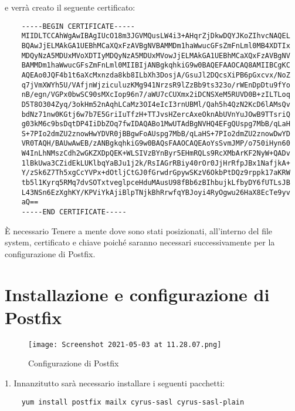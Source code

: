 e verrà creato il seguente certificato:

\begin{verbatim}
    -----BEGIN CERTIFICATE-----
    MIIDLTCCAhWgAwIBAgIUcO18m3JGVMQusLW4i3+AHqrZjDkwDQYJKoZIhvcNAQEL
    BQAwJjELMAkGA1UEBhMCaXQxFzAVBgNVBAMMDm1haWwucGFsZmFnLml0MB4XDTIx
    MDQyNzA5MDUxMVoXDTIyMDQyNzA5MDUxMVowJjELMAkGA1UEBhMCaXQxFzAVBgNV
    BAMMDm1haWwucGFsZmFnLml0MIIBIjANBgkqhkiG9w0BAQEFAAOCAQ8AMIIBCgKC
    AQEAo0JQF4b1t6aXcMxnzda8kb8ILbXh3DosjA/GsuJl2DQcsXiPB6pGxcvx/NoZ
    q7jVmXWYh5U/VAfjnWjziculuzKMg941NrzsR9lZzBb9ts323o/rWEnDpDtu9fYo
    nB/egn/VGPx0bwSC90sMXcIop96n7/aWU7cCUXmx2iDCNSXeM5RUVD0B+zILTLoq
    D5T8O304Zyq/3okHm52nAqhLCaMz3OI4eIcI3rnUBMl/Qah5h4QzN2KcD6lAMsQv
    bdNz71nw0KGtj6w7b7E5GriIuTfzH+TTJvsHZercAxeOknAbUVnYuJOwB9TTsriQ
    g03kM6c9bsDqtDP4IiDbZOq7fwIDAQABo1MwUTAdBgNVHQ4EFgQUspg7MbB/qLaH
    S+7PIo2dmZU2znowHwYDVR0jBBgwFoAUspg7MbB/qLaHS+7PIo2dmZU2znowDwYD
    VR0TAQH/BAUwAwEB/zANBgkqhkiG9w0BAQsFAAOCAQEAoYsSvmJMP/o750iHyn60
    W4InLhNMszCdh2wGKZXDpQEK+WLSIVzBYnByr5EHmRQLs9RcXMbArKF2NyW+QADv
    1lBkUwa3CZidEkLUKlbqYaBJu1j2k/RsIAGrRBiy40rOr0JjHrRfpJBx1NafjkA+
    Y/zSk6Z7Th5xgCcYVPx+dOtljCtGJ0fGrwdrGpywSKzV6OkbPtDQz9rppk17aKRW
    tb5l1Kyrq5RMq7dvSOTxtveglpceHduMAusU98fBb6zBIhbujkLfbyDY6fUTLsJB
    L43NSn6EzXghKY/KPViYkAjiBlpTNjkBhRrwfqYBJoyi4RyOgwu26HaX8EcTe9yv
    aQ==
    -----END CERTIFICATE-----

\end{verbatim}

È necessario Tenere a mente dove sono stati posizionati, all’interno del file system, 
certificato e chiave poiché saranno necessari successivamente per la configurazione di Postfix.

\section{Installazione e configurazione di Postfix}

\begin{figure}[htp]
    \centering
    \texttt{[image: Screenshot 2021-05-03 at 11.28.07.png]}
    \caption{Configurazione di Postfix}\label{confPostfix}
  \end{figure}

1. Innanzitutto sarà necessario installare i seguenti pacchetti:

\begin{verbatim}
    yum install postfix mailx cyrus-sasl cyrus-sasl-plain
\end{verbatim}


